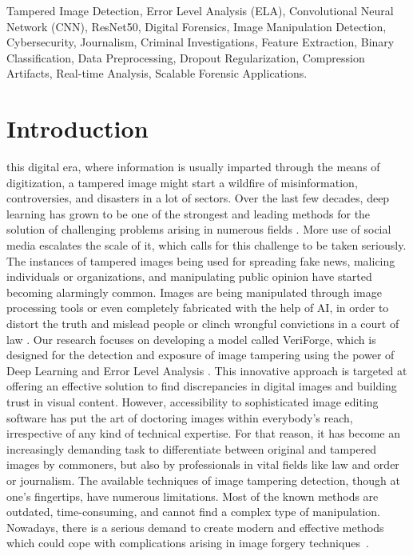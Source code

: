 \documentclass{ieeeaccess}
\begin{document}
\begin{keywords}
	Tampered Image Detection, Error Level Analysis (ELA), Convolutional Neural Network (CNN), ResNet50, Digital Forensics, Image Manipulation Detection, Cybersecurity, Journalism, Criminal Investigations, Feature Extraction, Binary Classification, Data Preprocessing, Dropout Regularization, Compression Artifacts, Real-time Analysis, Scalable Forensic Applications.
\end{keywords}

\titlepgskip=-21pt

\maketitle

\section{Introduction}
\label{sec:introduction}
 this digital era, where information is usually imparted through the means of digitization, a tampered image might start a wildfire of misinformation, controversies, and disasters in a lot of sectors. Over the last few decades, deep learning has grown to be one of the strongest and leading methods for the solution of challenging problems arising in numerous fields \cite{10035377}. More use of social media escalates the scale of it, which calls for this challenge to be taken seriously. The instances of tampered images being used for spreading fake news, malicing individuals or organizations, and manipulating public opinion have started becoming alarmingly common. Images are being manipulated through image processing tools or even completely fabricated with the help of AI, in order to distort the truth and mislead people or clinch wrongful convictions in a court of law \cite{8755865}. Our research focuses on developing a model called VeriForge, which is designed for the detection and exposure of image tampering using the power of Deep Learning and Error Level Analysis \cite{gupta2022detection}. This innovative approach is targeted at offering an effective solution to find discrepancies in digital images and building trust in visual content. However, accessibility to sophisticated image editing software has put the art of doctoring images within everybody's reach, irrespective of any kind of technical expertise. For that reason, it has become an increasingly demanding task to differentiate between original and tampered images by commoners, but also by professionals in vital fields like law and order or journalism. The available techniques of image tampering detection, though at one's fingertips, have numerous limitations. Most of the known methods are outdated, time-consuming, and cannot find a complex type of manipulation. Nowadays, there is a serious demand to create modern and effective methods which could cope with complications arising in image forgery techniques~\cite{kaur2019weak}.
\end{document}
